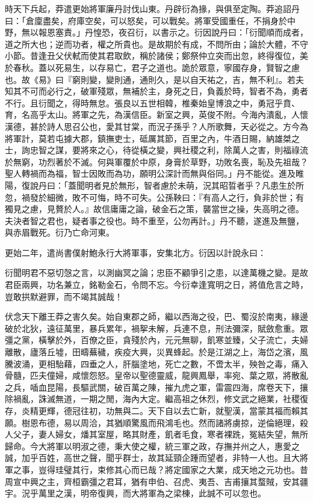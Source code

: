 \begin{pinyinscope}
時天下兵起，莽遣更始將軍廉丹討伐山東。丹辟衍為掾，與俱至定陶。莽追詔丹曰：「倉廩盡矣，府庫空矣，可以怒矣，可以戰矣。將軍受國重任，不捐身於中野，無以報恩塞責。」丹惶恐，夜召衍，以書示之。衍因說丹曰：「衍聞順而成者，道之所大也；逆而功者，權之所貴也。是故期於有成，不問所由；論於大體，不守小節。昔逢丑父伏軾而使其君取飲，稱於諸侯；鄭祭仲立突而出忽，終得復位，美於春秋。蓋以死易生，以存易亡，君子之道也。詭於眾意，寧國存身，賢智之慮也。故《易》曰『窮則變，變則通，通則久，是以自天祐之，吉，無不利』。若夫知其不可而必行之，破軍殘眾，無補於主，身死之日，負義於時，智者不為，勇者不行。且衍聞之，得時無怠。張良以五世相韓，椎秦始皇博浪之中，勇冠乎賁、育，名高乎太山。將軍之先，為漢信臣。新室之興，英俊不附。今海內潰亂，人懷漢德，甚於詩人思召公也，愛其甘棠，而況子孫乎？人所歌舞，天必從之。方今為將軍計，莫若屯據大郡，鎮撫吏士，砥厲其節，百里之內，牛酒日賜，納雄桀之士，詢忠智之謀，要將來之心，待從橫之變，興社稷之利，除萬人之害，則福祿流於無窮，功烈著於不滅。何與軍覆於中原，身膏於草野，功敗名喪，恥及先祖哉？聖人轉禍而為福，智士因敗而為功，願明公深計而無與俗同。」丹不能從。進及睢陽，復說丹曰：「蓋聞明者見於無形，智者慮於未萌，況其昭晢者乎？凡患生於所忽，禍發於細微，敗不可悔，時不可失。公孫鞅曰：『有高人之行，負非於世；有獨見之慮，見贅於人。』故信庸庸之論，破金石之策，襲當世之操，失高明之德。夫決者智之君也，疑者事之役也。時不重至，公勿再計。」丹不聽，遂進及無鹽，與赤眉戰死。衍乃亡命河東。

更始二年，遣尚書僕射鮑永行大將軍事，安集北方。衍因以計說永曰：

衍聞明君不惡切愨之言，以測幽冥之論；忠臣不顧爭引之患，以達萬機之變。是故君臣兩興，功名兼立，銘勒金石，令問不忘。今衍幸逢寬明之日，將值危言之時，豈敢拱默避罪，而不竭其誠哉！

伏念天下離王莽之害久矣。始自東郡之師，繼以西海之役，巴、蜀沒於南夷，緣邊破於北狄，遠征萬里，暴兵累年，禍挐未解，兵連不息，刑法彌深，賦斂愈重。眾彊之黨，橫擊於外，百僚之臣，貪殘於內，元元無聊，飢寒並臻，父子流亡，夫婦離散，廬落丘墟，田疇蕪穢，疾疫大興，災異蜂起。於是江湖之上，海岱之濱，風騰波涌，更相駘藉，四垂之人，肝腦塗地，死亡之數，不啻太半，殃咎之毒，痛入骨髓，匹夫僮婦，咸懷怨怒。皇帝以聖德靈威，龍興鳳舉，率宛、葉之眾，將散亂之兵，喢血昆陽，長驅武關，破百萬之陳，摧九虎之軍，雷震四海，席卷天下，攘除禍亂，誅滅無道，一期之閒，海內大定。繼高祖之休烈，修文武之絕業，社稷復存，炎精更輝，德冠往初，功無與二。天下自以去亡新，就聖漢，當蒙其福而賴其願。樹恩布德，易以周洽，其猶順驚風而飛鴻毛也。然而諸將虜掠，逆倫絕理，殺人父子，妻人婦女，燔其室屋，略其財產，飢者毛食，寒者裸跣，冤結失望，無所歸命。今大將軍以明淑之德，秉大使之權，統三軍之政，存撫并州之人，惠愛之誠，加乎百姓，高世之聲，聞乎群士，故其延頸企踵而望者，非特一人也。且大將軍之事，豈得珪璧其行，束修其心而已哉？將定國家之大業，成天地之元功也。昔周宣中興之主，齊桓霸彊之君耳，猶有申伯、召虎、夷吾、吉甫攘其蝥賊，安其疆宇。況乎萬里之漢，明帝復興，而大將軍為之梁棟，此誠不可以忽也。


\end{pinyinscope}
